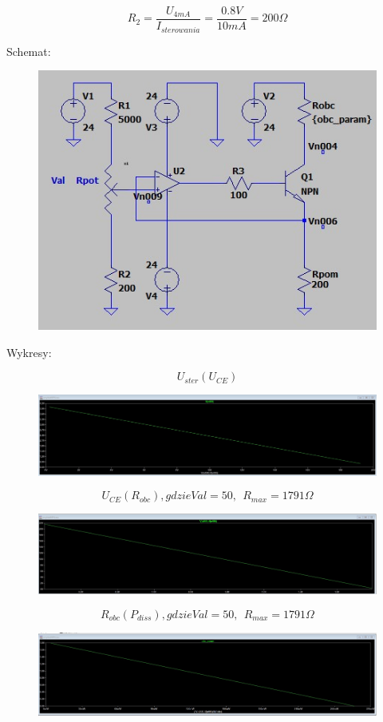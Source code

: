\documentclass{article}
\begin{document}
$$
    R_{2} = \frac{U_{4mA}}{I_{sterowania}} = \frac{0.8V}{10mA} = 200 \Omega
$$

Schemat:

\begin{figure}[h!]
    \centering
    \includegraphics[scale=0.5]{schemat_R_POM_200.jpg}
\end{figure}


\newpage
Wykresy:



$$U_{ster}(U_{CE})$$
    \begin{figure}[h!]
        \includegraphics[scale=0.3]{R_POM_200_U_ster_od_U_CE.jpg}
    \end{figure}
$$U_{CE}(R_{obc}), gdzie Val = 50, \ \ R_{max} = 1791 \Omega$$
\begin{figure}[h!]
    \includegraphics[scale=0.3]{R_POM_200_U_CE_od_R_obc.jpg}
\end{figure}
$$R_{obc}(P_{diss}), gdzie Val = 50, \ \ R_{max} =1791 \Omega$$
\begin{figure}[h!]
    \includegraphics[scale=0.3]{R_POM_200_R_obc_od_P_diss.jpg}
\end{figure}
\end{document}
